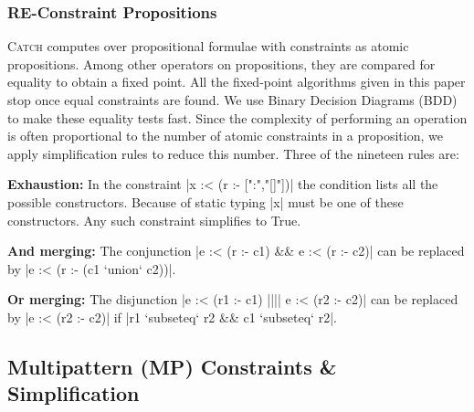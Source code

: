 \documentclass[preprint]{sigplanconf}
\newcommand{\catch}{\textsc{Catch}}
\newcommand{\para}[1]{\vspace{2mm}\noindent\textbf{#1}}
\newcommand{\ignore}{}
\begin{document}
\subsubsection{RE-Constraint Propositions}
\label{sec:re-propositions}

\catch{} computes over propositional formulae with constraints as atomic propositions. Among other operators on propositions, they are compared for equality to obtain a fixed point. All the fixed-point algorithms given in this paper stop once equal constraints are found. We use Binary Decision Diagrams (BDD) \citep{lee:bdd} to make these equality tests fast. Since the complexity of performing an operation is often proportional to the number of atomic constraints in a proposition, we apply simplification rules to reduce this number. Three of the nineteen rules are:

\para{Exhaustion:} In the constraint |x :< (r :- [":","[]"])| the condition lists all the possible constructors. Because of static typing |x| must be one of these constructors. Any such constraint simplifies to True.

\para{And merging:} The conjunction \ignore|e :< (r :- c1) && e :< (r :- c2)| can be replaced by \ignore|e :< (r :- (c1 `union` c2))|.

\para{Or merging:} The disjunction \ignore|e :< (r1 :- c1) |||| e :< (r2 :- c2)| can be replaced by \ignore|e :< (r2 :- c2)| if \ignore|r1 `subseteq` r2 && c1 `subseteq` r2|.


\subsection{Multipattern (MP) Constraints \& Simplification}
\label{sec:multipattern}
\end{document}
